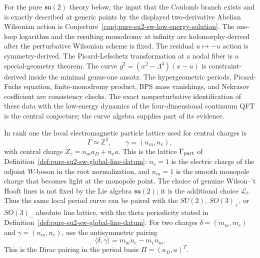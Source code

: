 For the pure \(\mathfrak{su}(2)\) theory below, the input that the Coulomb
branch exists and is exactly described at generic points by the displayed
two-derivative Abelian Wilsonian action is
Conjecture~\ref{conj:pure-su2-sw-low-energy-solution}.  The one-loop logarithm and the
resulting monodromy at infinity are holomorphy-derived after the perturbative
Wilsonian scheme is fixed.  The residual \(u\mapsto -u\) action is
symmetry-derived.  The Picard-Lefschetz transformation at a nodal fiber is a
special-geometry theorem.  The curve
\(y^2=(x^2-\Lambda^4)(x-u)\) is constraint-derived inside the minimal
genus-one ansatz.  The hypergeometric periods, Picard-Fuchs equation,
finite-monodromy product, BPS mass vanishings, and Nekrasov coefficient are
consistency checks.  The exact nonperturbative identification of these data
with the low-energy dynamics of the four-dimensional continuum QFT is the
central conjecture; the curve algebra supplies part of its evidence.

In rank one the local electromagnetic particle lattice used for central charges
is
\[
  \Gamma\simeq\mathbb Z^2,\qquad
  \gamma=(n_m,n_e),
\]
with central charge \(Z_\gamma=n_m a_D+n_e a\).  This is the lattice
\(\Gamma_{\rm part}\) of
Definition~\ref{def:pure-su2-sw-global-line-datum}: \(n_e=1\) is the electric
charge of the adjoint \(W\)-boson in the root normalization, and \(n_m=1\) is
the smooth monopole charge that becomes light at the monopole point.  The
choice of genuine Wilson--'t Hooft lines is not fixed by the Lie algebra
\(\mathfrak{su}(2)\); it is the additional choice
\(\mathcal L_\ell\).  Thus the same local period curve can be paired with the
\(SU(2)\), \(SO(3)_+\), or \(SO(3)_-\) absolute line lattice, with the theta
periodicity stated in
Definition~\ref{def:pure-su2-sw-global-line-datum}.  For two charges
\(\delta=(m_m,m_e)\) and \(\gamma=(n_m,n_e)\), use the antisymmetric pairing
\begin{equation}
  \langle \delta,\gamma\rangle
  =
  m_m n_e-m_e n_m .
  \label{eq:rank-one-em-pairing}
\end{equation}
This is the Dirac pairing in the period basis \(\Pi=(a_D,a)^T\).

